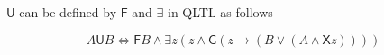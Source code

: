 \documentclass[12pt]{article}
\begin{document}
\begin{CJK*}{GBK}{song}
$\textsf{U}$ can be defined by $\textsf{F}$ and $\exists$ in QLTL as follows

$$A\textsf{U}B \Longleftrightarrow \textsf{F}B\wedge \exists z(z\wedge \textsf{G}(z\rightarrow (B\vee (A\wedge \textsf{X}z))))$$










\end{CJK*}
\end{document}
